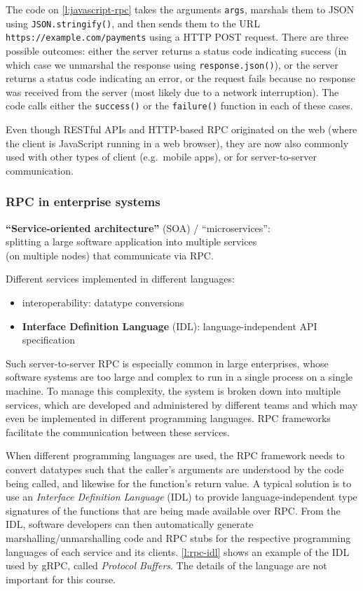 The code on \autoref{l:javascript-rpc} takes the arguments \verb|args|, marshals them to JSON using \verb|JSON.stringify()|, and then sends them to the URL \verb|https://example.com/payments| using a HTTP POST request.
There are three possible outcomes: either the server returns a status code indicating success (in which case we unmarshal the response using \verb|response.json()|), or the server returns a status code indicating an error, or the request fails because no response was received from the server (most likely due to a network interruption).
The code calls either the \verb|success()| or the \verb|failure()| function in each of these cases.

Even though RESTful APIs and HTTP-based RPC originated on the web (where the client is JavaScript running in a web browser), they are now also commonly used with other types of client (e.g.\ mobile apps), or for server-to-server communication.

\begin{frame}
    \label{s:rpc-discussion}
    \frametitle{RPC in enterprise systems}
    \textbf{``Service-oriented architecture''} (SOA) / ``microservices'':\\[1em]
    splitting a large software application into multiple services\\ (on multiple nodes) that communicate via RPC.\\[1.5em]\pause

    Different services implemented in different languages:
    \begin{itemize}
        \item interoperability: datatype conversions
        \item \textbf{Interface Definition Language} (IDL): language-independent API specification
    \end{itemize}
\end{frame}

Such server-to-server RPC is especially common in large enterprises, whose software systems are too large and complex to run in a single process on a single machine.
To manage this complexity, the system is broken down into multiple services, which are developed and administered by different teams and which may even be implemented in different programming languages.
RPC frameworks facilitate the communication between these services.

When different programming languages are used, the RPC framework needs to convert datatypes such that the caller's arguments are understood by the code being called, and likewise for the function's return value.
A typical solution is to use an \emph{Interface Definition Language} (IDL) to provide language-independent type signatures of the functions that are being made available over RPC.
From the IDL, software developers can then automatically generate marshalling/unmarshalling code and RPC stubs for the respective programming languages of each service and its clients.
\autoref{l:rpc-idl} shows an example of the IDL used by gRPC, called \emph{Protocol Buffers}.
The details of the language are not important for this course.

